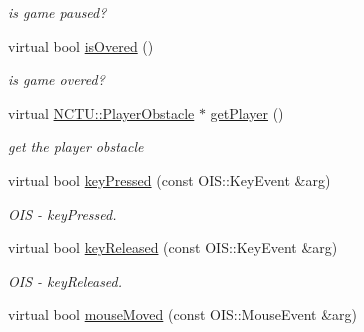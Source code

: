 \begin{DoxyCompactItemize}
\begin{DoxyCompactList}\small\item\em is game paused? \end{DoxyCompactList}\item 
virtual bool \hyperlink{class_basic_tutorial__00_a5f4f1c065645bcbb9e0312e4a06e3c8e}{is\+Overed} ()\hypertarget{class_basic_tutorial__00_a5f4f1c065645bcbb9e0312e4a06e3c8e}{}\label{class_basic_tutorial__00_a5f4f1c065645bcbb9e0312e4a06e3c8e}

\begin{DoxyCompactList}\small\item\em is game overed? \end{DoxyCompactList}\item 
virtual \hyperlink{class_n_c_t_u_1_1_player_obstacle}{N\+C\+T\+U\+::\+Player\+Obstacle} $\ast$ \hyperlink{class_basic_tutorial__00_a556b34103cda909d74561bfd779d7c89}{get\+Player} ()\hypertarget{class_basic_tutorial__00_a556b34103cda909d74561bfd779d7c89}{}\label{class_basic_tutorial__00_a556b34103cda909d74561bfd779d7c89}

\begin{DoxyCompactList}\small\item\em get the player obstacle \end{DoxyCompactList}\item 
virtual bool \hyperlink{class_basic_tutorial__00_adc1a0b32d78b1980b3ee51a1b1e1e69b}{key\+Pressed} (const O\+I\+S\+::\+Key\+Event \&arg)\hypertarget{class_basic_tutorial__00_adc1a0b32d78b1980b3ee51a1b1e1e69b}{}\label{class_basic_tutorial__00_adc1a0b32d78b1980b3ee51a1b1e1e69b}

\begin{DoxyCompactList}\small\item\em O\+IS -\/ key\+Pressed. \end{DoxyCompactList}\item 
virtual bool \hyperlink{class_basic_tutorial__00_aacca7a0a2a5a0e0d007b9c6c30b4941b}{key\+Released} (const O\+I\+S\+::\+Key\+Event \&arg)\hypertarget{class_basic_tutorial__00_aacca7a0a2a5a0e0d007b9c6c30b4941b}{}\label{class_basic_tutorial__00_aacca7a0a2a5a0e0d007b9c6c30b4941b}

\begin{DoxyCompactList}\small\item\em O\+IS -\/ key\+Released. \end{DoxyCompactList}\item 
virtual bool \hyperlink{class_basic_tutorial__00_a5b9bd30851c38fa6c2fa102f30e9629a}{mouse\+Moved} (const O\+I\+S\+::\+Mouse\+Event \&arg)\hypertarget{class_basic_tutorial__00_a5b9bd30851c38fa6c2fa102f30e9629a}{}\label{class_basic_tutorial__00_a5b9bd30851c38fa6c2fa102f30e9629a}


\end{DoxyCompactItemize}
